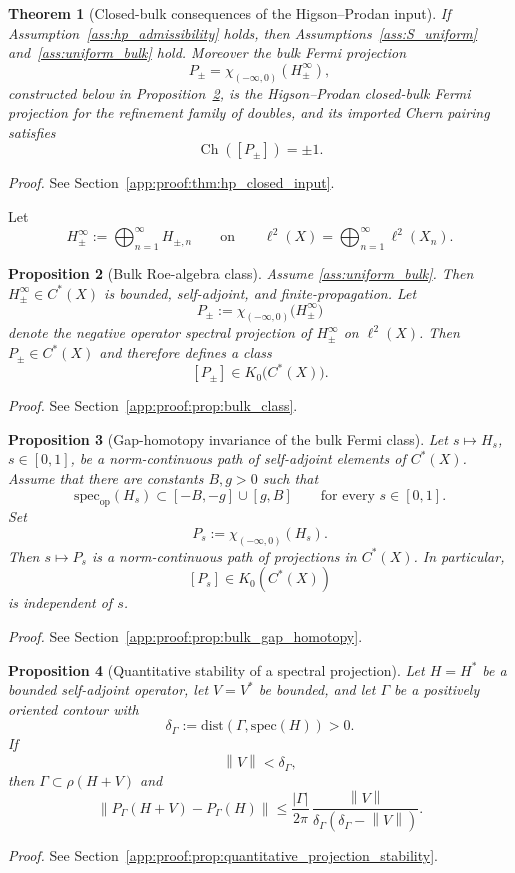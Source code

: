 \documentclass[11pt]{article}
\numberwithin{equation}{section}
\newtheorem{theorem}{Theorem}[section]
\newtheorem{proposition}[theorem]{Proposition}
\theoremstyle{definition}
\theoremstyle{remark}
\newcommand{\proofref}[1]{%
  \par\noindent\emph{Proof.} See Section~\ref{#1}.\par\medskip
}
\newcommand{\proofappendixref}[1]{\proofref{#1}}
\newcommand{\spec}{\mathrm{spec}}
\newcommand{\dist}{\mathrm{dist}}
\newcommand{\opnorm}[1]{\left\lVert#1\right\rVert}
\newcommand{\Ch}{\operatorname{Ch}}
\begin{document}
\begin{theorem}[Closed-bulk consequences of the Higson--Prodan input]\label{thm:hp_closed_input}\label{cor:hp_uniform_bulk}
If Assumption~\ref{ass:hp_admissibility} holds, then
Assumptions~\ref{ass:S_uniform} and~\ref{ass:uniform_bulk} hold. Moreover the bulk Fermi
projection
\[
P_\pm=\chi_{(-\infty,0)}(H_\pm^\infty),
\]
constructed below in Proposition~\ref{prop:bulk_class}, is the Higson--Prodan closed-bulk Fermi
projection for the refinement family of doubles, and its imported Chern pairing satisfies
\[
\Ch([P_\pm])=\pm1.
\]
\end{theorem}
\proofappendixref{app:proof:thm:hp_closed_input}




Let
\[
H_\pm^\infty:=\bigoplus_{n=1}^\infty H_{\pm,n}
\qquad\text{on}\qquad
\ell^2(X)=\bigoplus_{n=1}^\infty \ell^2(X_n).
\]

\begin{proposition}[Bulk Roe-algebra class]\label{prop:bulk_class}
Assume \ref{ass:uniform_bulk}. Then $H_\pm^\infty\in C^*(X)$ is bounded, self-adjoint, and
finite-propagation. Let
\[
P_\pm:=\chi_{(-\infty,0)}\!\bigl(H_\pm^\infty\bigr)
\]
denote the negative operator spectral projection of $H_\pm^\infty$ on $\ell^2(X)$. Then
$P_\pm\in C^*(X)$ and therefore defines a class
\[
[P_\pm]\in K_0\bigl(C^*(X)\bigr).
\]
\end{proposition}
\proofappendixref{app:proof:prop:bulk_class}




\begin{proposition}[Gap-homotopy invariance of the bulk Fermi class]\label{prop:bulk_gap_homotopy}
Let $s\mapsto H_s$, $s\in[0,1]$, be a norm-continuous path of self-adjoint elements of $C^*(X)$.
Assume that there are constants $B,g>0$ such that
\[
\spec_{\mathrm{op}}(H_s)\subset[-B,-g]\cup[g,B]
\qquad\text{for every }s\in[0,1].
\]
Set
\[
P_s:=\chi_{(-\infty,0)}(H_s).
\]
Then $s\mapsto P_s$ is a norm-continuous path of projections in $C^*(X)$. In particular,
\[
[P_s]\in K_0(C^*(X))
\]
is independent of $s$.
\end{proposition}
\proofappendixref{app:proof:prop:bulk_gap_homotopy}




\begin{proposition}[Quantitative stability of a spectral projection]\label{prop:quantitative_projection_stability}
Let $H=H^*$ be a bounded self-adjoint operator, let $V=V^*$ be bounded, and let $\Gamma$ be a
positively oriented contour with
\[
\delta_\Gamma:=\dist(\Gamma,\spec(H))>0.
\]
If
\[
\opnorm{V}<\delta_\Gamma,
\]
then $\Gamma\subset\rho(H+V)$ and
\[
\opnorm{P_\Gamma(H+V)-P_\Gamma(H)}
\le
\frac{|\Gamma|}{2\pi}\,
\frac{\opnorm{V}}{\delta_\Gamma(\delta_\Gamma-\opnorm{V})}.
\]
\end{proposition}
\proofappendixref{app:proof:prop:quantitative_projection_stability}
\end{document}
